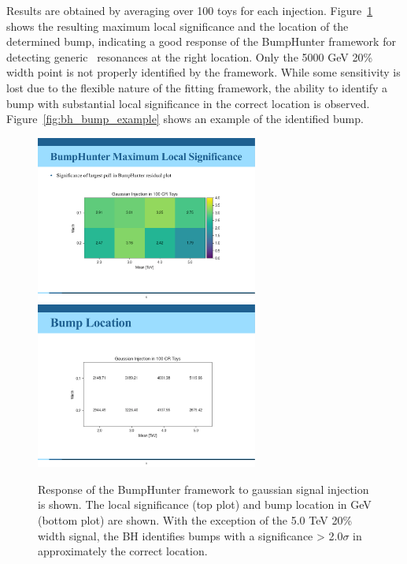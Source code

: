 Results are obtained by averaging over 100 toys for each injection.
Figure~\ref{fig:siginj_bh} shows the resulting maximum local significance and the location of the determined bump, indicating a good response of the BumpHunter framework for detecting generic \mt~resonances at the right location.
Only the 5000 GeV 20\% width point is not properly identified by the framework. 
While some sensitivity is lost due to the flexible nature of the fitting framework, the ability to identify a bump with substantial local significance in the correct location is observed.
Figure~\ref{fig:bh_bump_example} shows an example of the identified bump.

\begin{figure}[!htbp]
\centering
   \includegraphics[width=0.65\textwidth]{figures/stats/siginj_bh_localsig.pdf}
   \includegraphics[width=0.65\textwidth]{figures/stats/siginj_bh_bumploc.pdf}
    \caption{Response of the BumpHunter framework to gaussian signal injection is shown. The local significance (top plot) and bump location in GeV (bottom plot) are shown. With the exception of the 5.0 TeV 20\% width signal, the BH identifies bumps with a significance > 2.0$\sigma$ in approximately the correct location.
    \label{fig:siginj_bh}}
\end{figure}

